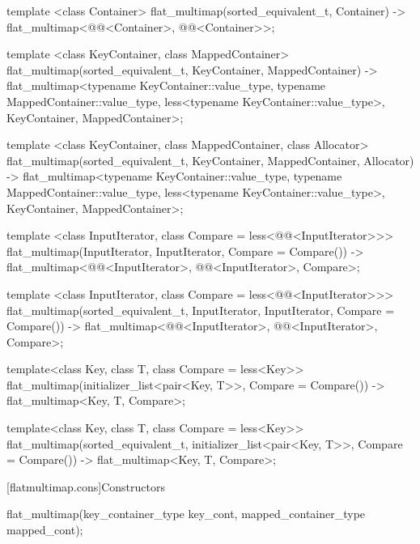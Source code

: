 \begin{addedblock}
\begin{codeblock}
{  template <class Container>
    flat_multimap(sorted_equivalent_t, Container)
      -> flat_multimap<@@<Container>, @@<Container>>;

  template <class KeyContainer, class MappedContainer>
    flat_multimap(sorted_equivalent_t, KeyContainer, MappedContainer)
      -> flat_multimap<typename KeyContainer::value_type,
                       typename MappedContainer::value_type,
                       less<typename KeyContainer::value_type>,
                       KeyContainer, MappedContainer>;

  template <class KeyContainer, class MappedContainer, class Allocator>
    flat_multimap(sorted_equivalent_t, KeyContainer, MappedContainer, Allocator)
      -> flat_multimap<typename KeyContainer::value_type,
                       typename MappedContainer::value_type,
                       less<typename KeyContainer::value_type>,
                       KeyContainer, MappedContainer>;

  template <class InputIterator, class Compare = less<@@<InputIterator>>>
    flat_multimap(InputIterator, InputIterator, Compare = Compare())
      -> flat_multimap<@@<InputIterator>, @@<InputIterator>, Compare>;

  template <class InputIterator, class Compare = less<@@<InputIterator>>>
    flat_multimap(sorted_equivalent_t, InputIterator, InputIterator,
                  Compare = Compare())
      -> flat_multimap<@@<InputIterator>, @@<InputIterator>, Compare>;

  template<class Key, class T, class Compare = less<Key>>
    flat_multimap(initializer_list<pair<Key, T>>, Compare = Compare())
      -> flat_multimap<Key, T, Compare>;

  template<class Key, class T, class Compare = less<Key>>
  flat_multimap(sorted_equivalent_t, initializer_list<pair<Key, T>>,
                Compare = Compare())
      -> flat_multimap<Key, T, Compare>;
}
\end{codeblock}

[flatmultimap.cons]{Constructors}

%
\begin{itemdecl}
flat_multimap(key_container_type key_cont, mapped_container_type mapped_cont);
\end{itemdecl}


\end{addedblock}
